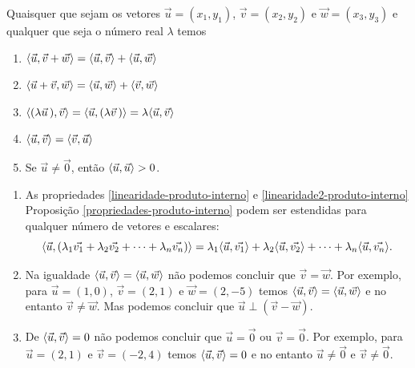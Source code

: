 \documentclass{beamer}
\begin{document}
    \begin{frame}
        \begin{proposicao}\label{propriedades-produto-interno}
          Quaisquer que sejam os vetores $\vec{u} = (x_1, y_1)$, $\vec{v} = (x_2, y_2)$ e $\vec{w} = (x_3, y_3)$ e qualquer que seja o número real $\lambda$ temos
          \begin{enumerate}[label=({\roman*})]
            \item\label{linearidade-produto-interno} $\langle \vec{u}, \vec{v} + \vec{w}\rangle = \langle \vec{u}, \vec{v} \rangle + \langle \vec{u}, \vec{w} \rangle$
            \item $\langle \vec{u} + \vec{v}, \vec{w}\rangle = \langle \vec{u}, \vec{w} \rangle + \langle \vec{v}, \vec{w} \rangle$
            \item\label{linearidade2-produto-interno} $\langle (\lambda \vec{u}\,), \vec{v}\rangle = \langle \vec{u}, (\lambda \vec{v}\,)\rangle = \lambda\langle \vec{u}, \vec{v} \rangle$
            \item $\langle \vec{u}, \vec{v} \rangle = \langle \vec{v}, \vec{u} \rangle$
            \item Se $\vec{u} \ne \vec{0}$, então $\langle \vec{u}, \vec{u} \rangle > 0$.
          \end{enumerate}
        \end{proposicao}
   \end{frame}

    \begin{frame}
        \begin{observacao}
          \begin{enumerate}[label=({\roman*})]
            \item As propriedades \ref{linearidade-produto-interno} e \ref{linearidade2-produto-interno} Proposição \ref{propriedades-produto-interno} podem ser estendidas para qualquer número de vetores e escalares:
            \[
              \langle\vec{u}, (\lambda_1\vec{v_1} + \lambda_2\vec{v_2} + \cdots + \lambda_n\vec{v_n} )\rangle = \lambda_1\langle \vec{u}, \vec{v_1} \rangle + \lambda_2\langle \vec{u}, \vec{v_2} \rangle + \cdots + \lambda_n\langle \vec{u}, \vec{v_n} \rangle.
            \]
            \item Na igualdade $\langle \vec{u}, \vec{v} \rangle = \langle \vec{u}, \vec{w} \rangle$ não podemos concluir que $\vec{v} = \vec{w}$. Por exemplo, para $\vec{u} = (1, 0)$, $\vec{v} = (2, 1)$ e $\vec{w} = (2, -5)$ temos $\langle \vec{u}, \vec{v} \rangle = \langle \vec{u}, \vec{w} \rangle$ e no entanto $\vec{v} \ne \vec{w}$. Mas podemos concluir que $\vec{u}\perp(\vec{v} - \vec{w})$.
            \item De $\langle \vec{u}, \vec{v} \rangle = 0$ não podemos concluir que $\vec{u} = \vec{0}$ ou $\vec{v} = \vec{0}$. Por exemplo, para $\vec{u} = (2, 1)$ e $\vec{v} = (-2, 4)$ temos $\langle \vec{u}, \vec{v} \rangle = 0$ e no entanto $\vec{u} \ne \vec{0}$ e $\vec{v} \ne \vec{0}$.
          \end{enumerate}
        \end{observacao}
    \end{frame}
\end{document}
